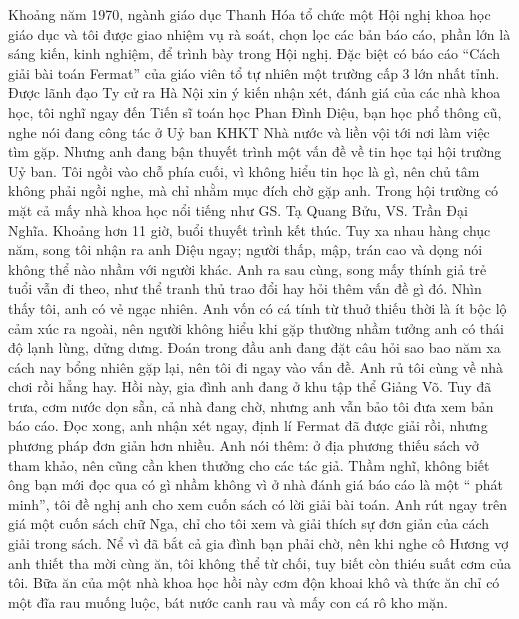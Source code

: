 Khoảng năm 1970, ngành giáo dục Thanh Hóa tổ chức một Hội nghị khoa học giáo dục và tôi được giao nhiệm vụ rà soát, chọn lọc các bản báo cáo, phần lớn là sáng kiến, kinh nghiệm, để trình bày trong Hội nghị. Đặc biệt có báo cáo “Cách giải bài toán Fermat” của giáo viên tổ tự nhiên một trường cấp 3 lớn nhất tỉnh. Được lãnh đạo Ty cử ra Hà Nội xin ý kiến nhận xét, đánh giá của các nhà khoa học, tôi nghĩ ngay đến Tiến sĩ toán học Phan Đình Diệu, bạn học phổ thông cũ, nghe nói đang công tác ở Uỷ ban KHKT Nhà nước và liền vội tới nơi làm việc tìm gặp. Nhưng anh đang bận thuyết trình một vấn đề về tin học tại hội trường Uỷ ban. Tôi ngồi vào chỗ phía cuối, vì không hiểu tin học là gì, nên chủ tâm không phải ngồi nghe, mà chỉ nhằm mục đích chờ gặp anh. Trong hội trường có mặt cả mấy nhà khoa học nổi tiếng như GS. Tạ Quang Bửu, VS. Trần Đại Nghĩa. Khoảng hơn 11 giờ, buổi thuyết trình kết thúc. Tuy xa nhau hàng chục năm, song tôi nhận ra anh Diệu ngay; người thấp, mập, trán cao và dọng nói không thể nào nhầm với người khác. Anh ra sau cùng, song mấy thính giả trẻ tuổi vẫn đi theo, như thể tranh thủ trao đổi hay hỏi thêm vấn đề gì đó. Nhìn thấy tôi, anh có vẻ ngạc nhiên. Anh vốn có cá tính từ thuở thiếu thời là ít bộc lộ cảm xúc ra ngoài, nên người không hiểu khi gặp thường nhầm tưởng anh có thái độ lạnh lùng, dửng dưng. Đoán trong đầu anh đang đặt câu hỏi sao bao năm xa cách nay bổng nhiên gặp lại, nên tôi đi ngay vào vấn đề. Anh rủ tôi cùng về nhà chơi rồi hẳng hay. Hồi này, gia đình anh đang ở khu tập thể Giảng Võ. Tuy đã trưa, cơm nước dọn sẵn, cả nhà đang chờ, nhưng anh vẫn bảo tôi đưa xem bản báo cáo. Đọc xong, anh nhận xét ngay, định lí Fermat đã được giải rồi, nhưng phương pháp đơn giản hơn nhiều. Anh nói thêm: ở địa phương thiếu sách vở tham khảo, nên cũng cần khen thưởng cho các tác giả. Thầm nghĩ, không biết ông bạn mới đọc qua có gì nhầm không vì ở nhà đánh giá báo cáo là một “ phát minh”, tôi đề nghị anh cho xem cuốn sách có lời giải bài toán. Anh rút ngay trên giá một cuốn sách chữ Nga, chỉ cho tôi xem và giải thích sự đơn giản của cách giải trong sách. Nể vì đã bắt cả gia đình bạn phải chờ, nên khi nghe cô Hương vợ anh thiết tha mời cùng ăn, tôi không thể từ chối, tuy biết còn thiéu suất cơm của tôi. Bữa ăn của một nhà khoa học hồi này cơm độn khoai khô và thức ăn chỉ có một đĩa rau muống luộc, bát nước canh rau và mấy con cá rô kho mặn.

